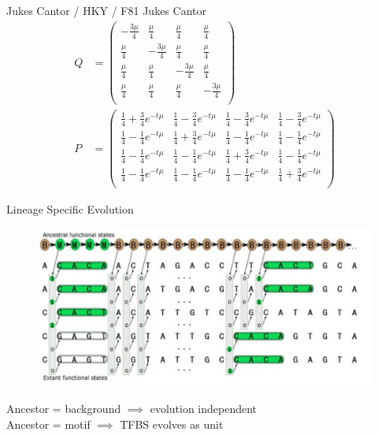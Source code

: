 \documentclass[10pt]{beamer}
\begin{document}
\begin{frame}[allowframebreaks]{Jukes Cantor / HKY / F81}
Jukes Cantor
\begin{align*}
Q &= \begin{pmatrix}
-\frac{3\mu}{4} & \frac{\mu}{4} & \frac{\mu}{4} & \frac{\mu}{4}\\
\frac{\mu}{4} & -\frac{3\mu}{4} &  \frac{\mu}{4} & \frac{\mu}{4}\\
\frac{\mu}{4} & \frac{\mu}{4} &  -\frac{3\mu}{4} & \frac{\mu}{4}\\
\frac{\mu}{4} & \frac{\mu}{4} & \frac{\mu}{4} & -\frac{3\mu}{4}\\
\end{pmatrix}\\
P &= \begin{pmatrix}
\frac{1}{4}+\frac{3}{4}e^{-t\mu} & \frac{1}{4}-\frac{3}{4}e^{-t\mu} & \frac{1}{4}-\frac{3}{4}e^{-t\mu} & \frac{1}{4}-\frac{3}{4}e^{-t\mu}\\
\frac{1}{4}-\frac{1}{4}e^{-t\mu} & \frac{1}{4}+\frac{3}{4}e^{-t\mu} & \frac{1}{4}-\frac{1}{4}e^{-t\mu} & \frac{1}{4}-\frac{1}{4}e^{-t\mu}\\
\frac{1}{4}-\frac{1}{4}e^{-t\mu} & \frac{1}{4}-\frac{1}{4}e^{-t\mu} & \frac{1}{4}+\frac{3}{4}e^{-t\mu} & \frac{1}{4}-\frac{1}{4}e^{-t\mu}\\
\frac{1}{4}-\frac{1}{4}e^{-t\mu} & \frac{1}{4}-\frac{1}{4}e^{-t\mu} & \frac{1}{4}-\frac{1}{4}e^{-t\mu} & \frac{1}{4}+\frac{3}{4}e^{-t\mu}\\
\end{pmatrix}
\end{align*}
\end{frame}


\begin{frame}[fragile]{Lineage Specific Evolution}
\begin{figure}
\includegraphics[width=\linewidth]{images/csmet2.png}
\end{figure}
Ancestor = background $\implies$ evolution independent\\ 
Ancestor =  motif $\implies$ TFBS evolves as unit
\end{frame}
\end{document}
